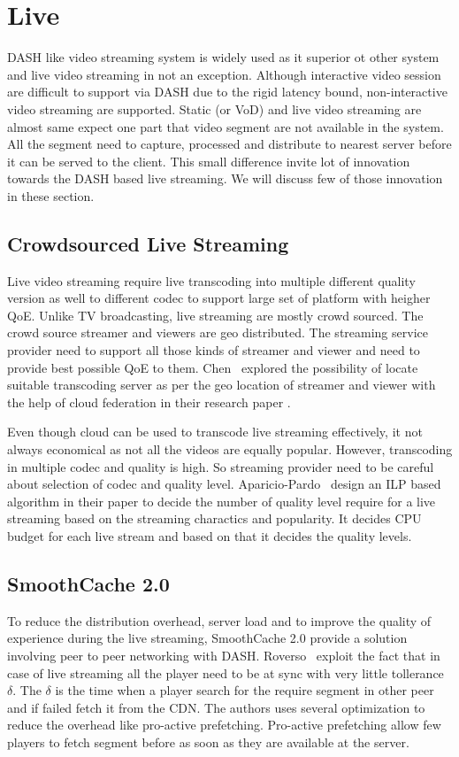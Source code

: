 
\section{Live}
DASH like video streaming system is widely used as it superior ot other system and live video streaming in not an exception. Although interactive video session are difficult to support via DASH due to the rigid latency bound, non-interactive video streaming are supported. Static (or VoD) and live video streaming are almost same expect one part that video segment are not available in the system. All the segment need to capture, processed and distribute to nearest server before it can be served to the client. This small difference invite lot of innovation towards the DASH based live streaming. We will discuss few of those innovation in these section.

\subsection{Crowdsourced Live Streaming}
Live video streaming require live transcoding into multiple different quality version as well to different codec to support large set of platform with heigher QoE. Unlike TV broadcasting, live streaming are mostly crowd sourced. The crowd source streamer and viewers are geo distributed. The streaming service provider need to support all those kinds of streamer and viewer and need to provide best possible QoE to them. Chen \etal\ explored the possibility of locate suitable transcoding server as per the geo location of streamer and viewer with the help of cloud federation in their research paper \cite{7218642}.

Even though cloud can be used to transcode live streaming effectively, it not always economical as not all the videos are equally popular. However, transcoding in multiple codec and quality is high. So streaming provider need to be careful about selection of codec and quality level. Aparicio-Pardo \etal\ design an ILP based algorithm in their paper \cite{10.1145/2713168.2713177} to decide the number of quality level require for a live streaming based on the streaming charactics and popularity. It decides CPU budget for each live stream and based on that it decides the quality levels.

\subsection{SmoothCache 2.0}
To reduce the distribution overhead, server load and to improve the quality of experience during the live streaming, SmoothCache 2.0\cite{10.1145/2713168.2713182} provide a solution involving peer to peer networking with DASH. Roverso \etal\ exploit the fact that in case of live streaming all the player need to be at sync with very little tollerance $\delta$. The $\delta$ is the time when a player search for the require segment in other peer and if failed fetch it from the CDN. The authors uses several optimization to reduce the overhead like pro-active prefetching. Pro-active prefetching allow few players to fetch segment before as soon as they are available at the server.